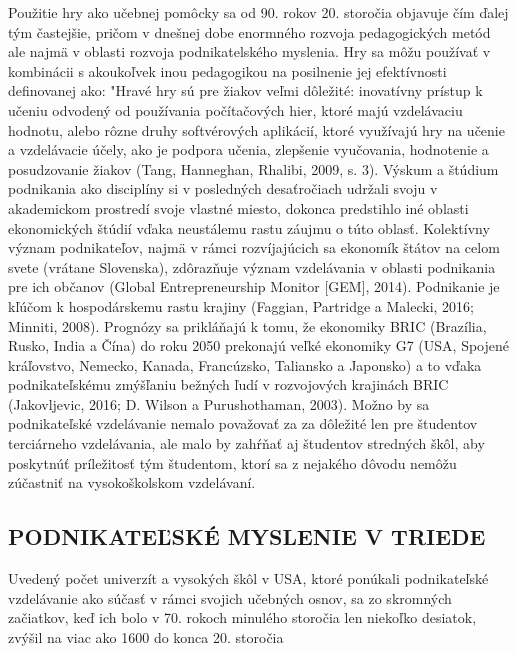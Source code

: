 \documentclass[10pt,oneside,slovak,a4paper]{article}
\begin{document}
Použitie hry ako učebnej pomôcky sa od 90. rokov 20. storočia objavuje čím ďalej tým častejšie, pričom v dnešnej dobe enormného rozvoja pedagogických metód ale najmä v oblasti rozvoja podnikatelského myslenia.
Hry sa môžu používať v kombinácii s akoukoľvek inou pedagogikou na posilnenie jej 
efektívnosti definovanej ako: "Hravé hry sú pre žiakov veľmi dôležité: inovatívny prístup k učeniu odvodený od používania počítačových hier, ktoré majú 
vzdelávaciu hodnotu, alebo rôzne druhy softvérových aplikácií, ktoré využívajú hry na učenie a 
vzdelávacie účely, ako je podpora učenia, zlepšenie vyučovania, hodnotenie a posudzovanie žiakov (Tang, Hanneghan, Rhalibi, 2009, s. 3).
Výskum a štúdium podnikania ako disciplíny si v posledných desaťročiach udržali svoju 
v akademickom prostredí svoje vlastné miesto, dokonca predstihlo iné oblasti ekonomických štúdií vďaka neustálemu rastu 
záujmu o túto oblasť. Kolektívny význam podnikateľov, najmä v rámci rozvíjajúcich sa 
ekonomík štátov na celom svete (vrátane Slovenska), zdôrazňuje význam vzdelávania v oblasti podnikania pre ich občanov (Global Entrepreneurship Monitor [GEM], 2014). Podnikanie je kľúčom k hospodárskemu rastu krajiny (Faggian, Partridge a Malecki, 2016; Minniti, 
2008). Prognózy sa prikláňajú k tomu, že ekonomiky BRIC (Brazília, Rusko, India a Čína) do roku 2050 prekonajú veľké ekonomiky G7 (USA, Spojené kráľovstvo, Nemecko, Kanada, Francúzsko, Taliansko a Japonsko) 
a to vďaka podnikateľskému zmýšľaniu bežných ľudí v rozvojových krajinách BRIC (Jakovljevic, 2016; 
D. Wilson a Purushothaman, 2003). Možno by sa podnikateľské vzdelávanie nemalo považovať za 
za dôležité len pre študentov terciárneho vzdelávania, ale malo by zahŕňať aj študentov stredných škôl, aby 
poskytnúť príležitosť tým študentom, ktorí sa z nejakého dôvodu nemôžu zúčastniť na vysokoškolskom vzdelávaní.
\subsection{PODNIKATEĽSKÉ MYSLENIE V TRIEDE }
Uvedený počet univerzít a vysokých škôl v USA, ktoré ponúkali podnikateľské vzdelávanie ako súčasť 
v rámci svojich učebných osnov, sa zo skromných začiatkov, keď ich bolo v 70. rokoch minulého storočia len niekoľko desiatok, zvýšil na 
viac ako 1600 do konca 20. storočia\cite{McDonald-ECTS}\\
\end{document}
